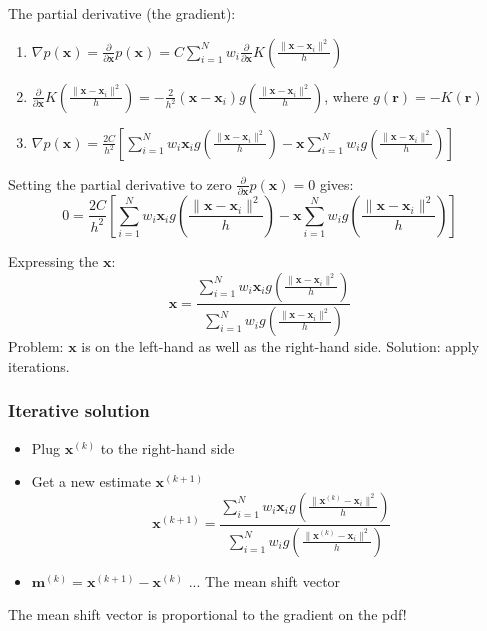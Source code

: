 \documentclass{article}
\begin{document}
\begin{multicols}{2}
	The partial derivative (the gradient):
	\begin{enumerate}
		\item $\nabla p(\mathbf{x}) = \frac{\partial}{\partial \mathbf{x}} p(\mathbf{x}) = C \sum_{i=1}^{N} w_i \frac{\partial}{\partial \mathbf{x}} K\left(\frac{\|\mathbf{x} - \mathbf{x}_i\|^2}{h}\right)$
		\item $\frac{\partial}{\partial \mathbf{x}} K\left(\frac{\|\mathbf{x} - \mathbf{x}_i\|^2}{h}\right) = -\frac{2}{h^2}(\mathbf{x} - \mathbf{x}_i)g\left(\frac{\|\mathbf{x} - \mathbf{x}_i\|^2}{h}\right)$,
		      where $g(\mathbf{r}) = -K(\mathbf{r})$
		\item $\nabla p(\mathbf{x}) = \frac{2C}{h^2} \left[ \sum_{i=1}^{N} w_i \mathbf{x}_i g\left(\frac{\|\mathbf{x} - \mathbf{x}_i\|^2}{h}\right) - \mathbf{x} \sum_{i=1}^{N} w_i g\left(\frac{\|\mathbf{x} - \mathbf{x}_i\|^2}{h}\right) \right]$
	\end{enumerate}

	Setting the partial derivative to zero $\frac{\partial}{\partial \mathbf{x}} p(\mathbf{x}) = 0$ gives:
	\[
		0 = \frac{2C}{h^2} \left[ \sum_{i=1}^{N} w_i \mathbf{x}_i g\left(\frac{\|\mathbf{x} - \mathbf{x}_i\|^2}{h}\right) - \mathbf{x} \sum_{i=1}^{N} w_i g\left(\frac{\|\mathbf{x} - \mathbf{x}_i\|^2}{h}\right) \right]
	\]

	Expressing the $\mathbf{x}$:
	\[
		\mathbf{x} = \frac{\sum_{i=1}^{N} w_i \mathbf{x}_i g\left(\frac{\|\mathbf{x} - \mathbf{x}_i\|^2}{h}\right)}{\sum_{i=1}^{N} w_i g\left(\frac{\|\mathbf{x} - \mathbf{x}_i\|^2}{h}\right)}
	\]
	Problem: $\mathbf{x}$ is on the left-hand as well as the right-hand side.
	Solution: apply iterations.

	\subsubsection{Iterative solution}

	\begin{itemize}
		\item Plug $\mathbf{x}^{(k)}$ to the right-hand side
		\item Get a new estimate $\mathbf{x}^{(k+1)}$
		      \[
			      \mathbf{x}^{(k+1)} = \frac{\sum_{i=1}^{N} w_i \mathbf{x}_i g\left(\frac{\|\mathbf{x}^{(k)} - \mathbf{x}_i\|^2}{h}\right)}{\sum_{i=1}^{N} w_i g\left(\frac{\|\mathbf{x}^{(k)} - \mathbf{x}_i\|^2}{h}\right)}
		      \]
		\item $\mathbf{m}^{(k)} = \mathbf{x}^{(k+1)} - \mathbf{x}^{(k)}$ ... The mean shift vector
	\end{itemize}
	The mean shift vector is proportional to the gradient on the pdf!



\end{multicols}
\end{document}
